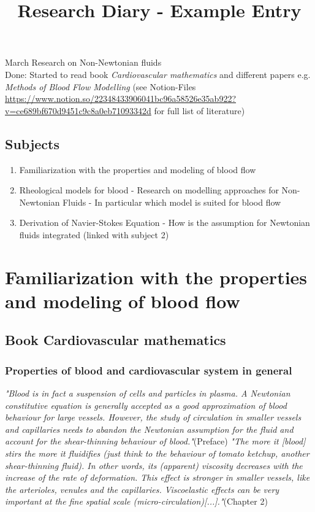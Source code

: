\documentclass[11pt,letterpaper]{article}
\begin{document}
\univlogo

\title{Research Diary - Example Entry}

{\Huge March Research on Non-Newtonian fluids}\\[5mm]
Done: Started to read book \textit{Cardiovascular mathematics} and different papers e.g.  \textit{Methods of Blood Flow Modelling} (see Notion-Files \newline \url{https://www.notion.so/22348433906041bc96a58526e35ab922?v=ce689bf670d9451c9c8a0eb71093342d} for full list of literature)

\subsection*{Subjects}

\begin{enumerate}
\item Familiarization with the properties and modeling of blood flow
\item Rheological models for blood - Research on modelling approaches for Non-Newtonian Fluids - In particular which model is suited for blood flow 
    \item Derivation of Navier-Stokes Equation - How is the assumption for Newtonian fluids integrated (linked with subject 2)
\end{enumerate}

\section{Familiarization with the properties and modeling of blood flow}
\subsection{Book Cardiovascular mathematics }
\subsubsection*{Properties of blood and cardiovascular system in general}

\textit{"Blood is in fact a suspension of cells and particles in plasma. A Newtonian constitutive equation is generally accepted as a good approximation of blood behaviour for large vessels. However, the study of circulation in smaller vessels and capillaries needs to abandon the Newtonian assumption for the fluid and account for the shear-thinning behaviour of blood."}(Preface) \newline\newline 
\textit{"The more it [blood] stirs the more it fluidifies (just think to the behaviour of tomato ketchup, another shear-thinning fluid). In other words, its (apparent) viscosity decreases with the increase of the rate of deformation. This effect is stronger in smaller vessels, like the arterioles, venules and the capillaries. Viscoelastic effects can be very important at the fine spatial scale (micro-circulation)[...]."}(Chapter 2)
\end{document}
